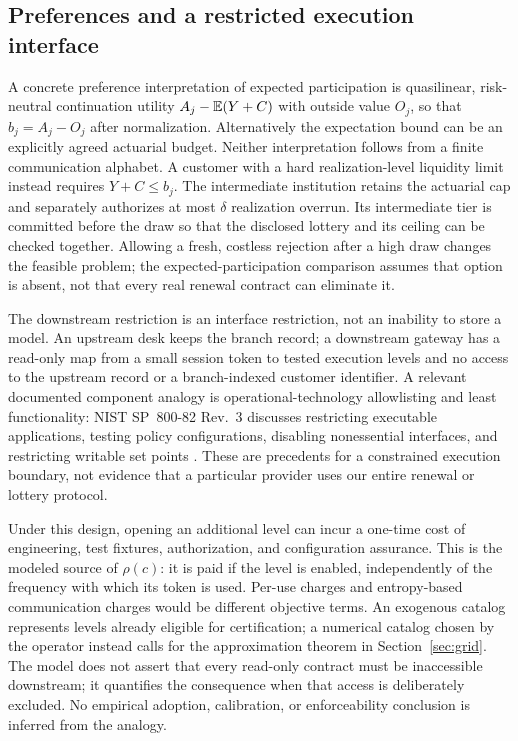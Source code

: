 \subsection{Preferences and a restricted execution interface}
A concrete preference interpretation of expected participation is quasilinear, risk-neutral continuation utility $A_j-\mathbb E(Y+C)$ with outside value $O_j$, so that $b_j=A_j-O_j$ after normalization. Alternatively the expectation bound can be an explicitly agreed actuarial budget. Neither interpretation follows from a finite communication alphabet. A customer with a hard realization-level liquidity limit instead requires $Y+C\leq b_j$. The intermediate institution retains the actuarial cap and separately authorizes at most $\delta$ realization overrun. Its intermediate tier is committed before the draw so that the disclosed lottery and its ceiling can be checked together. Allowing a fresh, costless rejection after a high draw changes the feasible problem; the expected-participation comparison assumes that option is absent, not that every real renewal contract can eliminate it.

The downstream restriction is an interface restriction, not an inability to store a model. An upstream desk keeps the branch record; a downstream gateway has a read-only map from a small session token to tested execution levels and no access to the upstream record or a branch-indexed customer identifier. A relevant documented component analogy is operational-technology allowlisting and least functionality: NIST SP~800-82 Rev.~3 discusses restricting executable applications, testing policy configurations, disabling nonessential interfaces, and restricting writable set points \citep[Sections~5.2.5.1, 6.2.4.1 and control CM-7]{StoufferEtAl2023}. These are precedents for a constrained execution boundary, not evidence that a particular provider uses our entire renewal or lottery protocol.

Under this design, opening an additional level can incur a one-time cost of engineering, test fixtures, authorization, and configuration assurance. This is the modeled source of $\rho(c)$: it is paid if the level is enabled, independently of the frequency with which its token is used. Per-use charges and entropy-based communication charges would be different objective terms. An exogenous catalog represents levels already eligible for certification; a numerical catalog chosen by the operator instead calls for the approximation theorem in Section~\ref{sec:grid}. The model does not assert that every read-only contract must be inaccessible downstream; it quantifies the consequence when that access is deliberately excluded. No empirical adoption, calibration, or enforceability conclusion is inferred from the analogy.
